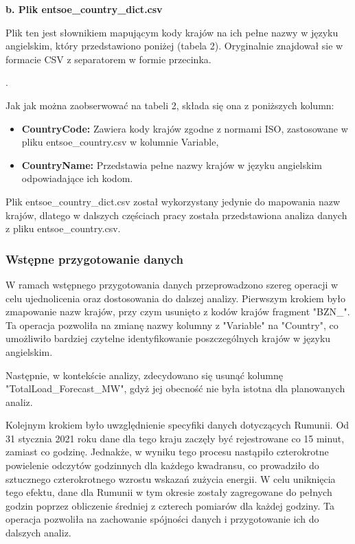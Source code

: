 \documentclass[polish, twoside, 12pt, a4paper]{article}
\theoremstyle{definition}
\theoremstyle{plain}
\theoremstyle{remark}
\begin{document}
\textbf{b. Plik entsoe\_country\_dict.csv}

Plik ten jest słownikiem mapującym kody krajów na ich pełne nazwy w języku angielskim, który przedstawiono poniżej (tabela 2). Oryginalnie znajdował sie w formacie CSV z separatorem w formie przecinka.

. 

Jak jak można zaobserwować na tabeli 2, składa się ona z poniższych kolumn:
\begin{itemize}
    \item \textbf{CountryCode:} Zawiera kody krajów zgodne z normami ISO, zastosowane w pliku entsoe\_country.csv w kolumnie Variable,
    \item \textbf{CountryName:} Przedstawia pełne nazwy krajów w języku angielskim odpowiadające ich kodom.
\end{itemize}

Plik entsoe\_country\_dict.csv został wykorzystany jedynie do mapowania nazw krajów, dlatego w dalszych częściach pracy została przedstawiona analiza danych z pliku entsoe\_country.csv.

\subsubsection{Wstępne przygotowanie danych}

W ramach wstępnego przygotowania danych przeprowadzono szereg operacji w celu ujednolicenia oraz dostosowania do dalszej analizy. 
Pierwszym krokiem było zmapowanie nazw krajów, przy czym usunięto z kodów krajów fragment "BZN\_". Ta operacja pozwoliła na zmianę nazwy kolumny z "Variable" na "Country", co umożliwiło bardziej czytelne identyfikowanie poszczególnych krajów w języku angielskim.

Następnie, w kontekście analizy, zdecydowano się usunąć kolumnę "TotalLoad\_Forecast\_MW", gdyż jej obecność nie była istotna dla planowanych analiz.

Kolejnym krokiem było uwzględnienie specyfiki danych dotyczących Rumunii. Od 31 stycznia 2021 roku dane dla tego kraju zaczęły być rejestrowane co 15 minut, zamiast co godzinę. Jednakże, w wyniku tego procesu nastąpiło czterokrotne powielenie odczytów godzinnych dla każdego kwadransu, co prowadziło do sztucznego czterokrotnego wzrostu wskazań zużycia energii. W celu uniknięcia tego efektu, dane dla Rumunii w tym okresie zostały zagregowane do pełnych godzin poprzez obliczenie średniej z czterech pomiarów dla każdej godziny. Ta operacja pozwoliła na zachowanie spójności danych i przygotowanie ich do dalszych analiz.
\end{document}
